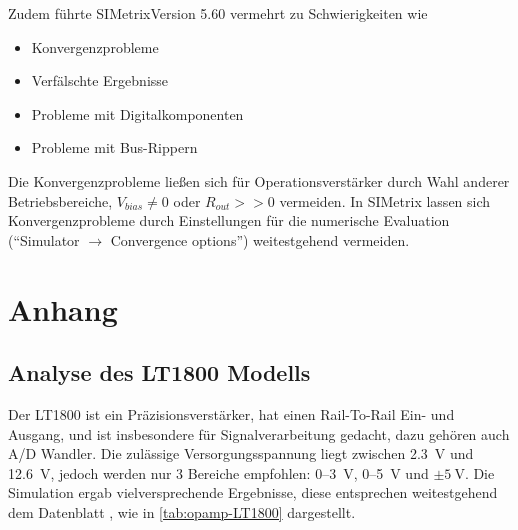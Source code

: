 \documentclass[
	ngerman,
	parskip=half,
	twocolumn,
	DIV=calc,
	]{scrartcl}
\begin{document}
		Zudem führte SIMetrix\texttrademark Version 5.60 vermehrt zu Schwierigkeiten wie 
		\begin{itemize}
			\item Konvergenzprobleme
			\item Verfälschte Ergebnisse 
			\item Probleme mit Digitalkomponenten
			\item Probleme mit Bus-Rippern
		\end{itemize}
	
		Die Konvergenzprobleme ließen sich für Operationsverstärker durch Wahl anderer Betriebsbereiche, $V_{bias} \neq 0$ oder $R_{out} >> 0$ vermeiden. In SIMetrix lassen sich Konvergenzprobleme durch Einstellungen für die numerische Evaluation (\enquote{Simulator $\rightarrow$ Convergence options}) weitestgehend vermeiden.
		
	\section{Anhang}
	
	\subsection{Analyse des LT1800 Modells}
	\label{sec:appendix_LT1800_analysis}
	Der LT1800 ist ein Präzisionsverstärker, hat einen Rail-To-Rail Ein- und Ausgang, und ist insbesondere für Signalverarbeitung gedacht, dazu gehören auch A/D Wandler. Die zulässige Versorgungsspannung liegt zwischen \SI{2.3}{\volt} und \SI{12.6}{\volt}, jedoch werden nur 3 Bereiche empfohlen: 0--\SI{3}{\volt}, 0--\SI{5}{\volt}  und $\pm\SI{5}{\volt} $. Die Simulation ergab vielversprechende Ergebnisse, diese entsprechen weitestgehend dem Datenblatt \cite{datasheet:LT1800}, wie in \cref{tab:opamp-LT1800}  dargestellt.
	
\end{document}
